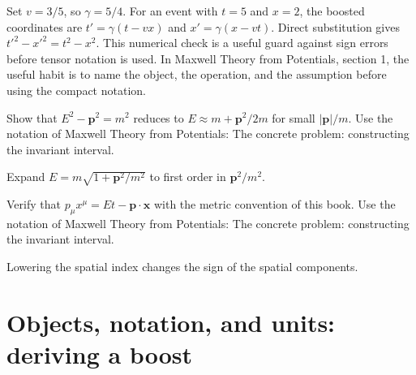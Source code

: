 \begin{example}
Set \(v=3/5\), so \(\gamma=5/4\).  For an event with \(t=5\) and \(x=2\), the boosted coordinates are \(t'=\gamma(t-vx)\) and \(x'=\gamma(x-vt)\).  Direct substitution gives \(t'^2-x'^2=t^2-x^2\).  This numerical check is a useful guard against sign errors before tensor notation is used.  In Maxwell Theory from Potentials, section 1, the useful habit is to name the object, the operation, and the assumption before using the compact notation.
\end{example}



\begin{exercise}
Show that \(E^2-\bm p^2=m^2\) reduces to \(E\approx m+\bm p^2/2m\) for small \(|\bm p|/m\).  Use the notation of Maxwell Theory from Potentials: The concrete problem: constructing the invariant interval.
\begin{answer}
Expand \(E=m\sqrt{1+\bm p^2/m^2}\) to first order in \(\bm p^2/m^2\).
\end{answer}
\end{exercise}

\begin{exercise}
Verify that \(p_\mu x^\mu=Et-\bm p\cdot\bm x\) with the metric convention of this book.  Use the notation of Maxwell Theory from Potentials: The concrete problem: constructing the invariant interval.
\begin{answer}
Lowering the spatial index changes the sign of the spatial components.
\end{answer}
\end{exercise}



\section{Objects, notation, and units: deriving a boost}













